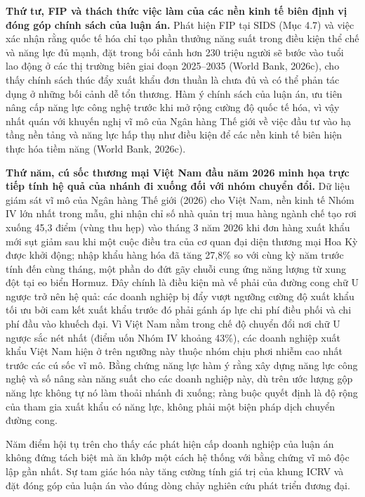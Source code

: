 \documentclass[
  a4paper,
  13pt]{extreport}
\begin{document}
\textbf{Thứ tư, FIP và thách thức việc làm của các nền kinh tế biên định
vị đóng góp chính sách của luận án.} Phát hiện FIP tại SIDS (Mục 4.7) và
việc xác nhận rằng quốc tế hóa chỉ tạo phần thưởng năng suất trong điều
kiện thể chế và năng lực đủ mạnh, đặt trong bối cảnh hơn 230 triệu người
sẽ bước vào tuổi lao động ở các thị trường biên giai đoạn 2025--2035
(World Bank, 2026c), cho thấy chính sách thúc đẩy xuất khẩu đơn thuần là
chưa đủ và có thể phản tác dụng ở những bối cảnh dễ tổn thương. Hàm ý
chính sách của luận án, ưu tiên nâng cấp năng lực công nghệ trước khi mở
rộng cường độ quốc tế hóa, vì vậy nhất quán với khuyến nghị vĩ mô của
Ngân hàng Thế giới về việc đầu tư vào hạ tầng nền tảng và năng lực hấp
thụ như điều kiện để các nền kinh tế biên hiện thực hóa tiềm năng (World
Bank, 2026c).

\textbf{Thứ năm, cú sốc thương mại Việt Nam đầu năm 2026 minh họa trực
tiếp tính hệ quả của nhánh đi xuống đối với nhóm chuyển đổi.} Dữ liệu
giám sát vĩ mô của Ngân hàng Thế giới (2026) cho Việt Nam, nền kinh tế
Nhóm IV lớn nhất trong mẫu, ghi nhận chỉ số nhà quản trị mua hàng ngành
chế tạo rơi xuống 45,3 điểm (vùng thu hẹp) vào tháng 3 năm 2026 khi đơn
hàng xuất khẩu mới sụt giảm sau khi một cuộc điều tra của cơ quan đại
diện thương mại Hoa Kỳ được khởi động; nhập khẩu hàng hóa đã tăng 27,8\%
so với cùng kỳ năm trước tính đến cùng tháng, một phần do đứt gãy chuỗi
cung ứng năng lượng từ xung đột tại eo biển Hormuz. Đây chính là điều
kiện mà vế phải của đường cong chữ U ngược trở nên hệ quả: các doanh
nghiệp bị đẩy vượt ngưỡng cường độ xuất khẩu tối ưu bởi cam kết xuất
khẩu trước đó phải gánh áp lực chi phí điều phối và chi phí đầu vào
khuếch đại. Vì Việt Nam nằm trong chế độ chuyển đổi nơi chữ U ngược sắc
nét nhất (điểm uốn Nhóm IV khoảng 43\%), các doanh nghiệp xuất khẩu Việt
Nam hiện ở trên ngưỡng này thuộc nhóm chịu phơi nhiễm cao nhất trước các
cú sốc vĩ mô. Bằng chứng năng lực hàm ý rằng xây dựng năng lực công nghệ
và số nâng sàn năng suất cho các doanh nghiệp này, dù trên ước lượng gộp
năng lực không tự nó làm thoải nhánh đi xuống; ràng buộc quyết định là
độ rộng của tham gia xuất khẩu có năng lực, không phải một biện pháp
dịch chuyển đường cong.

Năm điểm hội tụ trên cho thấy các phát hiện cấp doanh nghiệp của luận án
không đứng tách biệt mà ăn khớp một cách hệ thống với bằng chứng vĩ mô
độc lập gần nhất. Sự tam giác hóa này tăng cường tính giá trị của khung
ICRV và đặt đóng góp của luận án vào đúng dòng chảy nghiên cứu phát
triển đương đại.
\end{document}
